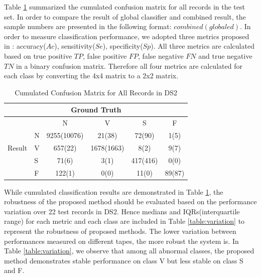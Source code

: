 Table \ref{table:classification_cumu} summarized the cumulated confusion matrix for all records in the test set. In order to compare the result of global classifier and combined result, the sample numbers are presented in the following format: $combined(globaled)$. In order to measure classification performance, we adopted three metrics proposed in \cite{Hu_et_al,deChazal2006,ince2009generic}: accuracy($Ac$), sensitivity($Se$), specificity($Sp$). All three metrics are calculated based on true positive $TP$, false positive $FP$, false negative $FN$ and true negative $TN$ in a binary confusion matrix. Therefore all four metrics are calculated for each class by converting the 4x4 matrix to a 2x2 matrix.

\begin{table}[t]
	\centering
	\caption{Cumulated Confusion Matrix for All Records in DS2}
	\vspace{-0.05in}
	\begin{tabular}{|l|l|c|c|c|c|}
		\hline 
		&  \multicolumn{4}{c}{Ground Truth} &\\ 
        \hline
		\multirow{5}{*}{Result} &  & N & V & S & F  \\\cline{2-6}
		& N & 9255(10076)& 21(38) & 72(90) & 1(5) \\\cline{2-6} 
		&V & 657(22) & 1678(1663) & 8(2) & 9(7)  \\\cline{2-6}
		&S & 71(6) & 3(1) & 417(416) & 0(0)  \\\cline{2-6}
        &F& 122(1) & 0(0) & 11(0) & 89(87)  \\\hline
	\end{tabular}
	\label{table:classification_cumu} 
	\vspace{-0.15in}
\end{table}

While cumulated classification results are demonstrated in Table \ref{table:classification_cumu}, the robustness of the proposed method should be evaluated based on the performance variation over 22 test records in DS2. Hence medians and IQRs(interquartile range) for each metric and each class are included in Table \ref{table:variation} to represent the robustness of proposed methods. The lower variation between performances measured on different tapes, the more robust the system is. In Table \ref{table:variation}, we observe that among all abnormal classes, the proposed method demonstrates stable performance on class V but less stable on class S and F.

